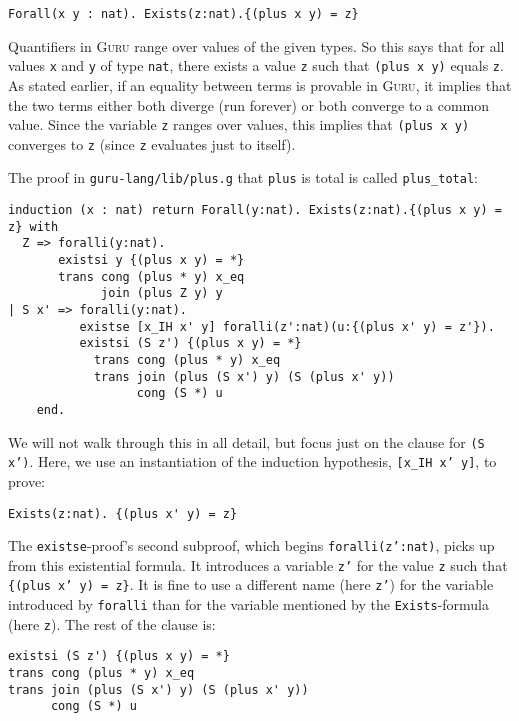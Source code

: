 \documentclass{book}[12pt]
\newcommand{\guru}[0]{\textsc{Guru}\xspace}
\begin{document}
\begin{verbatim}
Forall(x y : nat). Exists(z:nat).{(plus x y) = z}
\end{verbatim}

\noindent Quantifiers in \guru range over values of the given types.
So this says that for all values \texttt{x} and \texttt{y} of type
\texttt{nat}, there exists a value \texttt{z} such that \texttt{(plus
x y)} equals \texttt{z}.  As stated earlier, if an equality between
terms is provable in \guru, it implies that the two terms either both
diverge (run forever) or both converge to a common value.  Since the
variable \texttt{z} ranges over values, this implies that
\texttt{(plus x y)} converges to \texttt{z} (since \texttt{z}
evaluates just to itself).

The proof in \texttt{guru-lang/lib/plus.g} that \texttt{plus} is total
is called \texttt{plus\_total}:

\begin{verbatim}
induction (x : nat) return Forall(y:nat). Exists(z:nat).{(plus x y) = z} with
  Z => foralli(y:nat).
       existsi y {(plus x y) = *}
       trans cong (plus * y) x_eq
             join (plus Z y) y
| S x' => foralli(y:nat).
          existse [x_IH x' y] foralli(z':nat)(u:{(plus x' y) = z'}). 
          existsi (S z') {(plus x y) = *}  
            trans cong (plus * y) x_eq
            trans join (plus (S x') y) (S (plus x' y))
                  cong (S *) u
	end. 
\end{verbatim}

\noindent We will not walk through this in all detail, but focus just
on the clause for \texttt{(S x')}.  Here, we use an instantiation of
the induction hypothesis, \texttt{[x\_IH x' y]}, to prove:

\begin{verbatim}
Exists(z:nat). {(plus x' y) = z}
\end{verbatim}

\noindent The \texttt{existse}-proof's second subproof, which begins
\texttt{foralli(z':nat)}, picks up from this existential formula.  It
introduces a variable \texttt{z'} for the value \texttt{z} such that
\texttt{\{(plus x' y) = z\}}.  It is fine to use a different name
(here \texttt{z'}) for the variable introduced by \texttt{foralli}
than for the variable mentioned by the \texttt{Exists}-formula (here
\texttt{z}).  The rest of the clause is:

\begin{verbatim}
existsi (S z') {(plus x y) = *}  
trans cong (plus * y) x_eq
trans join (plus (S x') y) (S (plus x' y))
      cong (S *) u
\end{verbatim}
\end{document}
